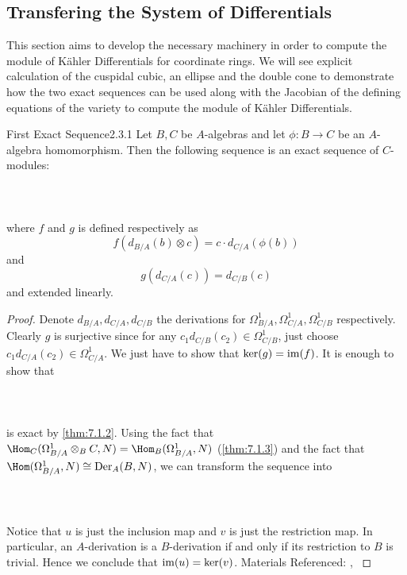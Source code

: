 \documentclass[a4paper]{article}
\begin{document}
\subsection{Transfering the System of Differentials}
This section aims to develop the necessary machinery in order to compute the module of Kähler Differentials for coordinate rings. We will see explicit calculation of the cuspidal cubic, an ellipse and the double cone to demonstrate how the two exact sequences can be used along with the Jacobian of the defining equations of the variety to compute the module of Kähler Differentials. 

\begin{thm}{First Exact Sequence}{2.3.1} Let $B,C$ be $A$-algebras and let $\phi:B\to C$ be an $A$-algebra homomorphism. Then the following sequence is an exact sequence of $C$-modules: \\~\\
 \\~\\
where $f$ and $g$ is defined respectively as $$f(d_{B/A}(b)\otimes c)=c\cdot d_{C/A}(\phi(b))$$ and $$g(d_{C/A}(c))=d_{C/B}(c)$$ and extended linearly. 
\begin{proof}
Denote $d_{B/A},d_{C/A},d_{C/B}$ the derivations for $\Omega_{B/A}^1,\Omega_{C/A}^1,\Omega_{C/B}^1$ respectively. Clearly $g$ is surjective since for any $c_1d_{C/B}(c_2)\in\Omega_{C/B}^1$, just choose $c_1d_{C/A}(c_2)\in\Omega_{C/A}^1$. We just have to show that $\ker(g)=\operatorname{im}(f)$. It is enough to show that \\~\\
\\~\\
is exact by \ref{thm:7.1.2}. Using the fact that $\Hom_C(\Omega_{B/A}^1\otimes_BC,N)=\Hom_B(\Omega_{B/A}^1,N)$ (\ref{thm:7.1.3}) and the fact that $\Hom(\Omega_{B/A}^1,N)\cong\text{Der}_A(B,N)$, we can transform the sequence into \\~\\
\\~\\
Notice that $u$ is just the inclusion map and $v$ is just the restriction map. In particular, an $A$-derivation is a $B$-derivation if and only if its restriction to $B$ is trivial. Hence we conclude that $\operatorname{im}(u)=\ker(v)$. 
Materials Referenced: \cite{Liu}, \cite{CRing}
\end{proof}
\end{thm}
\end{document}
